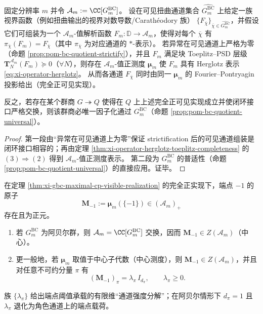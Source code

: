 \begin{theorem}\label{thm:xi-gbc-maximal-cp-visible-realization}
固定分辨率 \(m\) 并令 \(\mathcal{A}_m:=\CC[G^{\mathrm{BC}}_m]\)。
设在可见扭曲通道集合 \(\widehat{G^{\mathrm{BC}}_m}\) 上给定一族视界函数（例如扭曲输出的视界对数导数/Carath\'eodory 族）
\(\{F_{\overline\chi}\}_{\overline\chi\in\widehat{G^{\mathrm{BC}}_m}}\)，并假设它们可组装为一个 \(\mathcal{A}_m\)-值解析函数 \(F_m:\mathbb{D}\to\mathcal{A}_m\)，使得对每个 \(\overline\chi\) 有 \(\pi_{\overline\chi}(F_m)=F_{\overline\chi}\)（其中 \(\pi_{\overline\chi}\) 为对应通道的 \(\ast\)-表示）。
若异常在可见通道上严格为零（命题 \ref{prop:pom-bc-quotient-strictify}），并且 \(F_m\) 满足块 Toeplitz--PSD 层级 \(\mathbf{T}^{\mathcal{A}_m}_N(F_m)\succeq 0\)（\(\forall N\)），则存在 \(\mathcal{A}_m\)-值正测度 \(\boldsymbol\mu_m\) 使 \(F_m\) 具有 Herglotz 表示 \eqref{eq:xi-operator-herglotz}。
从而各通道 \(F_{\overline\chi}\) 同时由同一 \(\boldsymbol\mu_m\) 的 Fourier--Pontryagin 投影给出（完全正可见实现）。
\par
反之，若存在某个群商 \(G\twoheadrightarrow Q\) 使得在 \(Q\) 上上述完全正可见实现成立并使闭环接口严格交换，则该群商必唯一因子化通过 \(G^{\mathrm{BC}}_m\)（命题 \ref{prop:pom-bc-quotient-universal}）。
\end{theorem}

\begin{proof}
第一段由“异常在可见通道上为零”保证 strictification 后的可见通道组装是闭环接口相容的；再由定理 \ref{thm:xi-operator-herglotz-toeplitz-completeness} 的 \((3)\Rightarrow(2)\) 得到 \(\mathcal{A}_m\)-值正测度表示。
第二段为 \(G^{\mathrm{BC}}_m\) 的普适性（命题 \ref{prop:pom-bc-quotient-universal}）的直接应用。证毕。
\end{proof}

\begin{theorem}\label{thm:xi-endpoint-atom-central-channel-strength}
在定理 \ref{thm:xi-gbc-maximal-cp-visible-realization} 的完全正实现下，端点 \(-1\) 的原子
\[
\mathbf{M}_{-1}:=\boldsymbol\mu_m(\{-1\})\in(\mathcal{A}_m)_+
\]
存在且为正元。
\begin{enumerate}
  \item 若 \(G^{\mathrm{BC}}_m\) 为阿贝尔群，则 \(\mathcal{A}_m=\CC[G^{\mathrm{BC}}_m]\) 交换，因而 \(\mathbf{M}_{-1}\in Z(\mathcal{A}_m)\)（中心）。
  \item 更一般地，若 \(\boldsymbol\mu_m\) 取值于中心子代数（中心测度），则 \(\mathbf{M}_{-1}\in Z(\mathcal{A}_m)\)，并且对任意不可约分量 \(\pi\) 有
  \begin{equation}\label{eq:xi-endpoint-atom-channel-strength}
  \boxed{\;
  (\mathbf{M}_{-1})_\pi=\lambda_\pi\,I_{d_\pi},\qquad \lambda_\pi\ge 0.\;}
  \end{equation}
\end{enumerate}
族 \(\{\lambda_\pi\}\) 给出端点阈值承载的有限维“通道强度分解”；在阿贝尔情形下 \(d_\pi=1\) 且 \(\lambda_\pi\) 退化为角色通道上的端点载荷。
\end{theorem}

